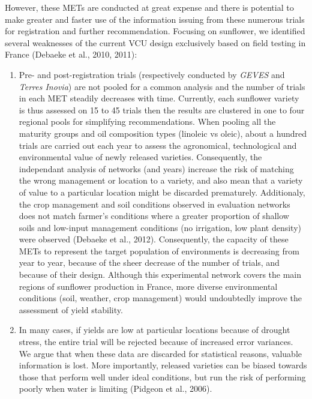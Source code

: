 \documentclass[a4paper]{article}
\begin{document}
However, these METs are conducted at great expense and there is
potential to make greater and faster use of the information issuing from
these numerous trials for registration and further recommendation.
Focusing on sunflower, we identified several weaknesses of the current
VCU design exclusively based on field testing in France (Debaeke et al.,
2010, 2011):

\begin{enumerate}
\def\labelenumi{(\arabic{enumi})}
\item
  Pre- and post-registration trials (respectively conducted by
  \emph{GEVES} and \emph{Terres Inovia}) are not pooled for a common
  analysis and the number of trials in each MET steadily decreases with
  time. Currently, each sunflower variety is thus assessed on 15 to 45
  trials then the results are clustered in one to four regional pools
  for simplifying recommendations. When pooling all the maturity groups
  and oil composition types (linoleic vs oleic), about a hundred trials
  are carried out each year to assess the agronomical, technological and
  environmental value of newly released varieties. Consequently, the
  independant analysis of networks (and years) increase the risk of
  matching the wrong management or location to a variety, and also mean
  that a variety of value to a particular location might be discarded
  prematurely. Additionaly, the crop management and soil conditions
  observed in evaluation networks does not match farmer's conditions
  where a greater proportion of shallow soils and low-input management
  conditions (no irrigation, low plant density) were observed (Debaeke
  et al., 2012). Consequently, the capacity of these METs to represent
  the target population of environments is decreasing from year to year,
  because of the sheer decrease of the number of trials, and because of
  their design. Although this experimental network covers the main
  regions of sunflower production in France, more diverse environmental
  conditions (soil, weather, crop management) would undoubtedly improve
  the assessment of yield stability.
\item
  In many cases, if yields are low at particular locations because of
  drought stress, the entire trial will be rejected because of increased
  error variances. We argue that when these data are discarded for
  statistical reasons, valuable information is lost. More importantly,
  released varieties can be biased towards those that perform well under
  ideal conditions, but run the risk of performing poorly when water is
  limiting (Pidgeon et al., 2006).

\end{enumerate}
\end{document}
